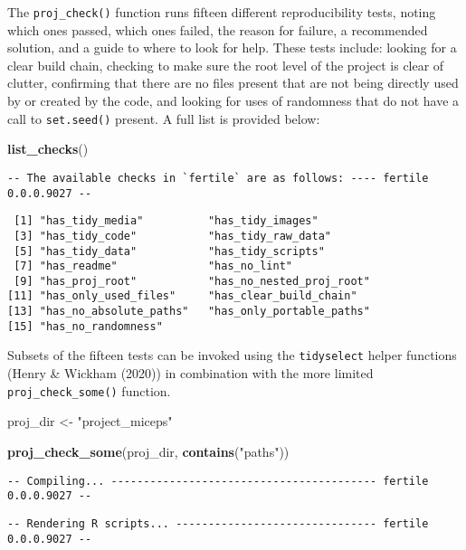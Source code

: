\documentclass[12pt,twoside]{reedthesis}
\newenvironment{Shaded}{\begin{snugshade}}{\end{snugshade}}
\newcommand{\KeywordTok}[1]{\textcolor[rgb]{0.13,0.29,0.53}{\textbf{#1}}}
\newcommand{\StringTok}[1]{\textcolor[rgb]{0.31,0.60,0.02}{#1}}
\newcommand{\NormalTok}[1]{#1}
\begin{document}
The \texttt{proj\_check()} function runs fifteen different
reproducibility tests, noting which ones passed, which ones failed, the
reason for failure, a recommended solution, and a guide to where to look
for help. These tests include: looking for a clear build chain, checking
to make sure the root level of the project is clear of clutter,
confirming that there are no files present that are not being directly
used by or created by the code, and looking for uses of randomness that
do not have a call to \texttt{set.seed()} present. A full list is
provided below:
\begin{Shaded}
\begin{Highlighting}[]
\KeywordTok{list_checks}\NormalTok{()}
\end{Highlighting}
\end{Shaded}
\begin{verbatim}
-- The available checks in `fertile` are as follows: ---- fertile 0.0.0.9027 --
\end{verbatim}
\begin{verbatim}
 [1] "has_tidy_media"          "has_tidy_images"        
 [3] "has_tidy_code"           "has_tidy_raw_data"      
 [5] "has_tidy_data"           "has_tidy_scripts"       
 [7] "has_readme"              "has_no_lint"            
 [9] "has_proj_root"           "has_no_nested_proj_root"
[11] "has_only_used_files"     "has_clear_build_chain"  
[13] "has_no_absolute_paths"   "has_only_portable_paths"
[15] "has_no_randomness"      
\end{verbatim}
Subsets of the fifteen tests can be invoked using the
\texttt{tidyselect} helper functions (Henry \& Wickham (2020)) in
combination with the more limited \texttt{proj\_check\_some()} function.
\begin{Shaded}
\begin{Highlighting}[]
\NormalTok{proj_dir <-}\StringTok{ "project_miceps"}
\end{Highlighting}
\end{Shaded}
\begin{Shaded}
\begin{Highlighting}[]
\KeywordTok{proj_check_some}\NormalTok{(proj_dir, }\KeywordTok{contains}\NormalTok{(}\StringTok{"paths"}\NormalTok{))}
\end{Highlighting}
\end{Shaded}
\begin{verbatim}
-- Compiling... ----------------------------------------- fertile 0.0.0.9027 --
\end{verbatim}
\begin{verbatim}
-- Rendering R scripts... ------------------------------- fertile 0.0.0.9027 --
\end{verbatim}
\end{document}
